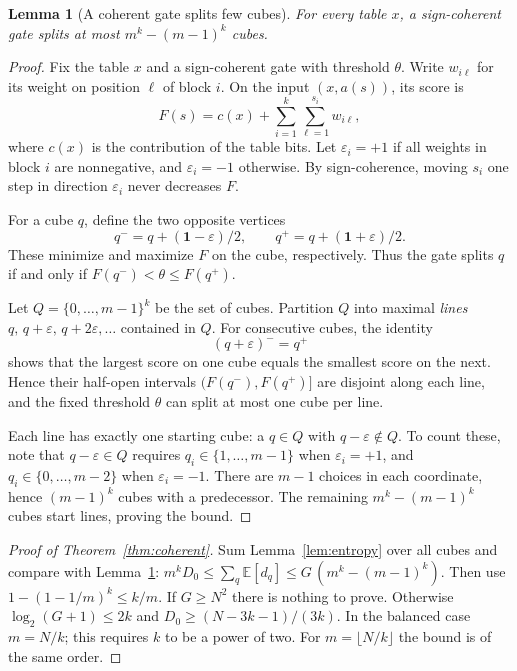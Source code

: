 \documentclass[11pt,letterpaper]{article}
\newtheorem{lemma}[theorem]{Lemma}
\theoremstyle{remark}
\begin{document}
\begin{lemma}[A coherent gate splits few cubes]\label{lem:diag}
For every table $x$, a sign-coherent gate splits at most $m^k-(m-1)^k$ cubes.
\end{lemma}
\begin{proof}
Fix the table $x$ and a sign-coherent gate with threshold $\theta$.
Write $w_{i\ell}$ for its weight on position $\ell$ of block $i$.
On the input $(x,a(s))$, its score is
\[
F(s)=c(x)+\sum_{i=1}^k\sum_{\ell=1}^{s_i}w_{i\ell},
\]
where $c(x)$ is the contribution of the table bits. Let $\varepsilon_i=+1$
if all weights in block $i$ are nonnegative, and $\varepsilon_i=-1$
otherwise. By sign-coherence, moving $s_i$ one step in direction
$\varepsilon_i$ never decreases $F$.

For a cube $q$, define the two opposite vertices
\[
q^-=q+(\mathbf1-\varepsilon)/2,
\qquad q^+=q+(\mathbf1+\varepsilon)/2.
\]
These minimize and maximize $F$ on the cube, respectively. Thus the gate
splits $q$ if and only if $F(q^-)<\theta\le F(q^+)$.

Let $Q=\{0,\dots,m-1\}^k$ be the set of cubes. Partition $Q$ into maximal
\emph{lines} $q,\,q+\varepsilon,\,q+2\varepsilon,\dots$ contained in $Q$.
For consecutive cubes, the identity
\[
(q+\varepsilon)^-=q^+
\]
shows that the largest score on one cube equals the smallest score on the
next. Hence their half-open intervals $(F(q^-),F(q^+)]$ are disjoint
along each line, and the fixed threshold $\theta$ can split at most one
cube per line.

Each line has exactly one starting cube: a $q\in Q$ with
$q-\varepsilon\notin Q$. To count these, note that $q-\varepsilon\in Q$
requires $q_i\in\{1,\dots,m-1\}$ when $\varepsilon_i=+1$, and
$q_i\in\{0,\dots,m-2\}$ when $\varepsilon_i=-1$. There are $m-1$ choices
in each coordinate, hence $(m-1)^k$ cubes with a predecessor.
The remaining $m^k-(m-1)^k$ cubes start lines, proving the bound.
\end{proof}

\begin{proof}[Proof of Theorem~\ref{thm:coherent}]
Sum Lemma~\ref{lem:entropy} over all cubes and compare with
Lemma~\ref{lem:diag}: $m^kD_0\le\sum_q\mathbb E[d_q]\le G\,(m^k-(m-1)^k)$.
Then use $1-(1-1/m)^k\le k/m$. If $G\ge N^2$ there is nothing to prove. Otherwise $\log_2(G+1)\le2k$ and
$D_0\ge(N-3k-1)/(3k)$. In the balanced case $m=N/k$; this requires $k$ to be
a power of two. For $m=\lfloor N/k\rfloor$ the bound is of the same order.
\end{proof}
\end{document}

